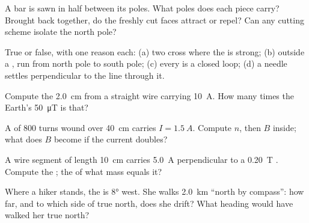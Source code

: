 \begin{exercise}[$\star$]\label{exo:g11:magnetic-fields:1}
A bar  is sawn in half between its poles. What poles does each
piece carry? Brought back together, do the freshly cut faces attract
or repel? Can any cutting scheme isolate the north pole?
\end{exercise}

\begin{exercise}[$\star$]\label{exo:g11:magnetic-fields:2}
True or false, with one reason each: (a) two 
cross where the  is strong; (b) outside a ,  run
from north pole to south pole; (c) every  is a
closed loop; (d) a needle settles perpendicular to the line through it.
\end{exercise}

\begin{exercise}[$\star$]\label{exo:g11:magnetic-fields:3}
Compute the  \qty{2.0}{cm} from a straight wire carrying
\qty{10}{A}. How many times the Earth's \qty{50}{\micro T} is that?
\end{exercise}

\begin{exercise}[$\star$]\label{exo:g11:magnetic-fields:4}
A  of $800$ turns wound over \qty{40}{cm} carries
$I = \qty{1.5}{A}$. Compute $n$, then $B$ inside; what does $B$ become
if the current doubles?
\end{exercise}

\begin{exercise}[$\star$]\label{exo:g11:magnetic-fields:5}
A wire segment of length \qty{10}{cm} carries \qty{5.0}{A}
perpendicular to a \qty{0.20}{T} . Compute the ; the
 of what mass equals it?
\end{exercise}

\begin{exercise}[$\star\star$]\label{exo:g11:magnetic-fields:6}
Where a hiker stands, the  is $\ang{8}$ west. She walks
\qty{2.0}{km} ``north by compass'': how far, and to which side of true
north, does she drift? What heading would have walked her true north?
\end{exercise}

